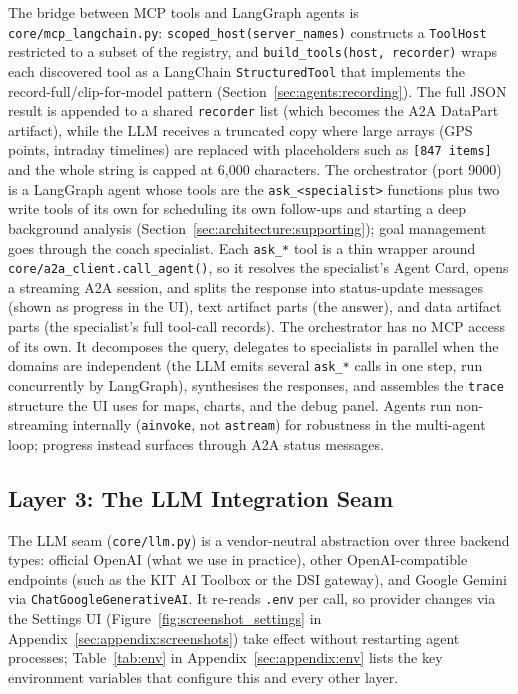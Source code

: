 The bridge between MCP tools and LangGraph agents is \texttt{core/mcp\_langchain.py}: \texttt{scoped\_host(server\_names)} constructs a \texttt{ToolHost} restricted to a subset of the registry, and \texttt{build\_tools(host, recorder)} wraps each discovered tool as a LangChain \texttt{StructuredTool} that implements the record-full/clip-for-model pattern (Section~\ref{sec:agents:recording}). The full JSON result is appended to a shared \texttt{recorder} list (which becomes the A2A DataPart artifact), while the LLM receives a truncated copy where large arrays (GPS points, intraday timelines) are replaced with placeholders such as \texttt{[847 items]} and the whole string is capped at 6{,}000 characters. The orchestrator (port 9000) is a LangGraph agent whose tools are the \texttt{ask\_<specialist>} functions plus two write tools of its own for scheduling its own follow-ups and starting a deep background analysis (Section~\ref{sec:architecture:supporting}); goal management goes through the coach specialist. Each \texttt{ask\_*} tool is a thin wrapper around \texttt{core/a2a\_client.call\_agent()}, so it resolves the specialist's Agent Card, opens a streaming A2A session, and splits the response into status-update messages (shown as progress in the UI), text artifact parts (the answer), and data artifact parts (the specialist's full tool-call records). The orchestrator has no MCP access of its own. It decomposes the query, delegates to specialists in parallel when the domains are independent (the LLM emits several \texttt{ask\_*} calls in one step, run concurrently by LangGraph), synthesises the responses, and assembles the \texttt{trace} structure the UI uses for maps, charts, and the debug panel. Agents run non-streaming internally (\texttt{ainvoke}, not \texttt{astream}) for robustness in the multi-agent loop; progress instead surfaces through A2A status messages.

\subsection{Layer 3: The LLM Integration Seam}\label{sec:architecture:llm}

The LLM seam (\texttt{core/llm.py}) is a vendor-neutral abstraction over three backend types: official OpenAI (what we use in practice), other OpenAI-compatible endpoints (such as the KIT AI Toolbox or the DSI gateway), and Google Gemini via \texttt{ChatGoogleGenerativeAI}. It re-reads \texttt{.env} per call, so provider changes via the Settings UI (Figure~\ref{fig:screenshot_settings} in Appendix~\ref{sec:appendix:screenshots}) take effect without restarting agent processes; Table~\ref{tab:env} in Appendix~\ref{sec:appendix:env} lists the key environment variables that configure this and every other layer.

